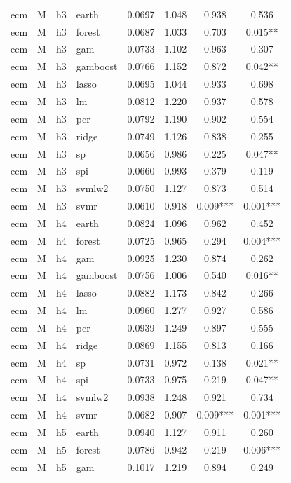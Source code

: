 \begin{ThreePartTable}
\begin{longtable}[t]{llclcccc}
\addlinespace
ecm & M & h3 & earth & 0.0697 & 1.048 & 0.938 & 0.536\\
ecm & M & h3 & forest & 0.0687 & 1.033 & 0.703 & 0.015**\\
ecm & M & h3 & gam & 0.0733 & 1.102 & 0.963 & 0.307\\
ecm & M & h3 & gamboost & 0.0766 & 1.152 & 0.872 & 0.042**\\
ecm & M & h3 & lasso & 0.0695 & 1.044 & 0.933 & 0.698\\
ecm & M & h3 & lm & 0.0812 & 1.220 & 0.937 & 0.578\\
ecm & M & h3 & pcr & 0.0792 & 1.190 & 0.902 & 0.554\\
ecm & M & h3 & ridge & 0.0749 & 1.126 & 0.838 & 0.255\\
ecm & M & h3 & sp & 0.0656 & 0.986 & 0.225 & 0.047**\\
ecm & M & h3 & spi & 0.0660 & 0.993 & 0.379 & 0.119\\
ecm & M & h3 & svmlw2 & 0.0750 & 1.127 & 0.873 & 0.514\\
ecm & M & h3 & svmr & 0.0610 & 0.918 & 0.009*** & 0.001***\\
\addlinespace
ecm & M & h4 & earth & 0.0824 & 1.096 & 0.962 & 0.452\\
ecm & M & h4 & forest & 0.0725 & 0.965 & 0.294 & 0.004***\\
ecm & M & h4 & gam & 0.0925 & 1.230 & 0.874 & 0.262\\
ecm & M & h4 & gamboost & 0.0756 & 1.006 & 0.540 & 0.016**\\
ecm & M & h4 & lasso & 0.0882 & 1.173 & 0.842 & 0.266\\
ecm & M & h4 & lm & 0.0960 & 1.277 & 0.927 & 0.586\\
ecm & M & h4 & pcr & 0.0939 & 1.249 & 0.897 & 0.555\\
ecm & M & h4 & ridge & 0.0869 & 1.155 & 0.813 & 0.166\\
ecm & M & h4 & sp & 0.0731 & 0.972 & 0.138 & 0.021**\\
ecm & M & h4 & spi & 0.0733 & 0.975 & 0.219 & 0.047**\\
ecm & M & h4 & svmlw2 & 0.0938 & 1.248 & 0.921 & 0.734\\
ecm & M & h4 & svmr & 0.0682 & 0.907 & 0.009*** & 0.001***\\
\addlinespace
ecm & M & h5 & earth & 0.0940 & 1.127 & 0.911 & 0.260\\
ecm & M & h5 & forest & 0.0786 & 0.942 & 0.219 & 0.006***\\
ecm & M & h5 & gam & 0.1017 & 1.219 & 0.894 & 0.249\\

\end{longtable}
\end{ThreePartTable}
